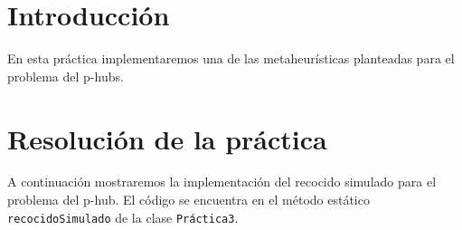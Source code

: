 \documentclass[12pt,a4paper,twoside,openright,titlepage,final]{article}
\author{José Ignacio Escribano}
\begin{document}
\setcounter{page}{1}


\listoftables
\thispagestyle{empty}
\newpage

\tableofcontents
\thispagestyle{empty}
\newpage

\setcounter{page}{1}

\section{Introducción}

En esta práctica implementaremos una de las metaheurísticas planteadas para el problema del p-hubs.


\section{Resolución de la práctica}

A continuación mostraremos la implementación del recocido simulado para el problema del p-hub. El código se encuentra en el método estático \texttt{recocidoSimulado} de la clase \texttt{Práctica3}.
\end{document}
